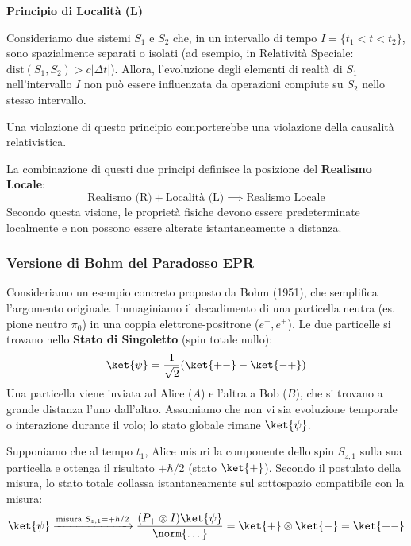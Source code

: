 \begin{definition}
    \textbf{Principio di Località (L)}
    
    Consideriamo due sistemi \( S_1 \) e \( S_2 \) che, in un intervallo di tempo \( I = \{ t_1 < t < t_2 \} \), sono spazialmente separati o isolati (ad esempio, in Relatività Speciale: \( \text{dist}(S_1, S_2) > c|\Delta t| \)).
    Allora, l'evoluzione degli elementi di realtà di \( S_1 \) nell'intervallo \( I \) non può essere influenzata da operazioni compiute su \( S_2 \) nello stesso intervallo.
    
    Una violazione di questo principio comporterebbe una violazione della causalità relativistica.
\end{definition}

La combinazione di questi due principi definisce la posizione del \textbf{Realismo Locale}:
\[
    \text{Realismo (R)} + \text{Località (L)} \implies \text{Realismo Locale}
\]
Secondo questa visione, le proprietà fisiche devono essere predeterminate localmente e non possono essere alterate istantaneamente a distanza.

\subsubsection{Versione di Bohm del Paradosso EPR}

Consideriamo un esempio concreto proposto da Bohm (1951), che semplifica l'argomento originale.
Immaginiamo il decadimento di una particella neutra (es. pione neutro $\pi_0$) in una coppia elettrone-positrone ($e^-, e^+$).
Le due particelle si trovano nello \textbf{Stato di Singoletto} (spin totale nullo):
\[
    \ket{\psi} = \frac{1}{\sqrt{2}} (\ket{+-} - \ket{-+})
\]
Una particella viene inviata ad Alice ($A$) e l'altra a Bob ($B$), che si trovano a grande distanza l'uno dall'altro. Assumiamo che non vi sia evoluzione temporale o interazione durante il volo; lo stato globale rimane $\ket{\psi}$.

Supponiamo che al tempo $t_1$, Alice misuri la componente dello spin $S_{z,1}$ sulla sua particella e ottenga il risultato $+\hbar/2$ (stato $\ket{+}$).
Secondo il postulato della misura, lo stato totale collassa istantaneamente sul sottospazio compatibile con la misura:
\[
    \ket{\psi} \xrightarrow{\text{misura } S_{z,1}=+\hbar/2} \frac{(P_+ \otimes I)\ket{\psi}}{\norm{\dots}} = \ket{+} \otimes \ket{-} = \ket{+-}
\]


